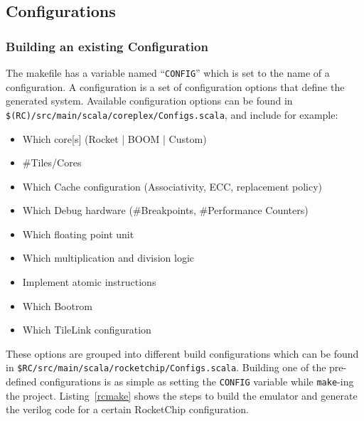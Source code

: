 \documentclass[journal,a4paper]{IEEEtran}
\begin{document}
\subsection{Configurations}

\subsubsection{Building an existing Configuration}
The makefile has a variable named ``\texttt{CONFIG}'' which is set to the name of a configuration.
A configuration is a set of configuration options that define the generated system.
Available configuration options can be found in \texttt{\$(RC)/src/main/scala/coreplex/Configs.scala}, and include for example:

\begin{itemize}
	\item Which core[s] (Rocket | BOOM | Custom)
	\item \#Tiles/Cores
	\item Which Cache configuration (Associativity, ECC, replacement policy)
	\item Which Debug hardware (\#Breakpoints, \#Performance Counters)
	\item Which floating point unit
	\item Which multiplication and division logic
	\item Implement atomic instructions
	\item Which Bootrom
	\item Which TileLink configuration
\end{itemize}
These options are grouped into different build configurations which can be found in \texttt{\$RC/src/main/scala/rocketchip/Configs.scala}.
Building one of the pre-defined configurations is as simple as setting the \texttt{CONFIG} variable while \texttt{make}-ing the project.
Listing~\ref{rcmake} shows the steps to build the emulator and generate the verilog code for a certain RocketChip configuration.
\end{document}
